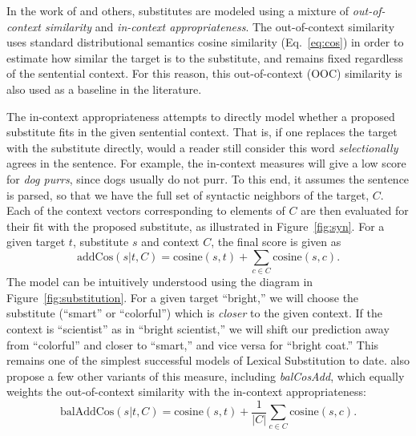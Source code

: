 \documentclass[12pt]{article}
\begin{document}
In the work of  and others, substitutes are modeled
using a mixture of {\em out-of-context similarity} and {\em in-context
appropriateness}. The out-of-context similarity uses standard distributional
semantics cosine similarity (Eq.~\ref{eq:cos}) in order to estimate how similar
the target is to the substitute, and remains fixed regardless of the sentential
context.  For this reason, this out-of-context (OOC) similarity is also used as
a baseline in the literature.

The in-context appropriateness attempts to directly model
whether a proposed substitute fits in the given sentential context. That is, if
one replaces the target with the substitute directly, would a reader still
consider this word {\em selectionally} agrees in the sentence. For example,
the in-context measures will give a low score for {\em dog purrs}, since dogs
usually do not purr.
To this end, it assumes the sentence is parsed, so that we have the full set of
syntactic neighbors of the target, $C$. Each of the context vectors
corresponding to elements of $C$ are then evaluated for their fit with the
proposed substitute, as illustrated in Figure~\ref{fig:syn}. For a given target
$t$, substitute $s$ and context $C$, the final \addCos score is given as
\begin{equation}
  \text{addCos}(s|t,C) = \text{cosine}(s, t) + \sum_{c\in C} \text{cosine}(s, c).
\end{equation}
The model can be intuitively understood using the diagram in
Figure~\ref{fig:substitution}. For a given target ``bright,'' we will choose
the substitute (``smart'' or ``colorful'') which is {\em closer} to the
given context. If the context is ``scientist'' as in ``bright scientist,''
we will shift our prediction away from ``colorful'' and closer to ``smart,''
and vice versa for ``bright coat.'' This remains one of the simplest successful
models of Lexical Substitution to date.  also propose
a few other variants of this measure, including {\em balCosAdd}, which equally
weights the out-of-context similarity with the in-context appropriateness:
\begin{equation}
  \text{balAddCos}(s|t,C) = \text{cosine}(s, t) + \frac{1}{|C|}\sum_{c\in C} \text{cosine}(s, c).
\end{equation}
\end{document}
